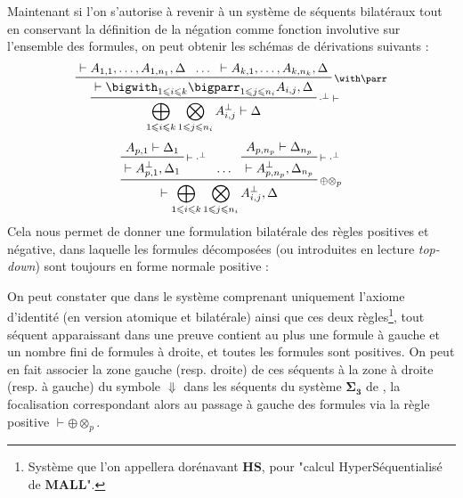 \documentclass[11pt]{report}
\newcommand{\seq}{\vdash}
\newcommand{\irule}[1]{\footnotesize$#1$}
\newcommand{\iruleL}[1]{\irule{{#1}\seq}}
\newcommand{\iruleR}[1]{\irule{\seq{#1}}}
\begin{document}
Maintenant si l'on s'autorise à revenir à un système de séquents bilatéraux tout en conservant la définition de la négation comme fonction involutive sur l'ensemble des formules, on peut obtenir les schémas de dérivations suivants :
\begin{displaymath}
	\prftree[r]{\iruleL{\cdot^\bot}}
		{\prftree[r]{\irule{\with\parr}}
			{\seq A_{1,1},\ldots,A_{1,n_1},\Delta}
			{\ldots}
			{\seq A_{k,1},\ldots,A_{k,n_k},\Delta}
			{\seq \bigwith_{1 \leqslant i \leqslant k} \bigparr_{1 \leqslant j \leqslant n_i} A_{i,j},\Delta}}
		{\bigoplus_{1 \leqslant i \leqslant k} \bigotimes_{1 \leqslant j \leqslant n_i} A_{i,j}^\bot \seq \Delta}
\end{displaymath}
\begin{displaymath}
	\prftree[r]{\irule{\oplus\otimes_p}}
		{\prftree[r]{\iruleR{\cdot^\bot}}
			{A_{p,1} \seq \Delta_1}
			{\seq A_{p,1}^\bot,\Delta_1}}
		{\ldots}
		{\prftree[r]{\iruleR{\cdot^\bot}}
			{A_{p,n_p} \seq \Delta_{n_p}}
			{\seq A_{p,n_p}^\bot,\Delta_{n_p}}}
		{\seq \bigoplus_{1 \leqslant i \leqslant k} \bigotimes_{1 \leqslant j \leqslant n_i} A_{i,j}^\bot,\Delta}
\end{displaymath}
Cela nous permet de donner une formulation bilatérale des règles positives et négative, dans laquelle les formules décomposées (ou introduites en lecture \textit{top-down}) sont toujours en forme normale positive :
On peut constater que dans le système comprenant uniquement l'axiome d'identité (en version atomique et bilatérale) ainsi que ces deux règles\footnote{Système que l'on appellera dorénavant $\mathbf{HS}$, pour "calcul HyperSéquentialisé de $\mathbf{MALL}$".}, tout séquent apparaissant dans une preuve contient au plus une formule à gauche et un nombre fini de formules à droite, et toutes les formules sont positives. On peut en fait associer la zone gauche (resp. droite) de ces séquents à la zone à droite (resp. à gauche) du symbole $\Downarrow$ dans les séquents du système $\bm{\Sigma_3}$ de \cite{And92}, la focalisation correspondant alors au passage à gauche des formules via la règle positive {\iruleR{\oplus\otimes_p}}.
\end{document}
